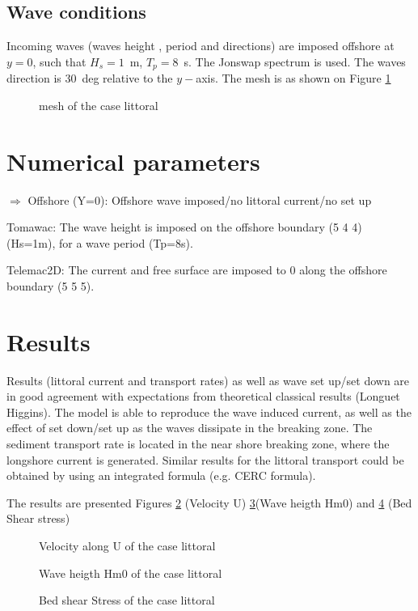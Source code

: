 \subsection{Wave conditions}
Incoming waves (waves height , period and directions) are imposed offshore at $y=0$, such
that $H_s=1$~m, $T_p=8$~s. The Jonswap spectrum is used. The waves direction is $30$~deg
relative to the $y-$axis.
The mesh is as shown on Figure \ref{littoralmesh}
\begin{figure} [!h]
\centering
{}
 \caption{mesh of the case littoral}
\label{littoralmesh}
\end{figure}

\section{Numerical parameters}
%
$\Rightarrow $ Offshore (Y=0): Offshore wave imposed/no littoral current/no set up

Tomawac:
The wave height is imposed on the offshore boundary (5 4 4) (Hs=1m), for a wave period
(Tp=8s).

Telemac2D:
The current and free surface are imposed to 0 along the offshore boundary (5 5 5).

%
%
\section{Results}
%
Results (littoral current and transport rates) as well as wave set up/set down are in good
agreement with expectations from theoretical classical results (Longuet Higgins). The
model is able to reproduce the wave induced current, as well as the effect of set down/set
up as the waves dissipate in the breaking zone.
The sediment transport rate is located in the near shore breaking zone, where the longshore
current is generated.
Similar results for the littoral transport could be obtained by using an integrated formula
(e.g. CERC formula).

The results are presented Figures \ref{resultsT2D} (Velocity U) \ref{resultsTOM}(Wave
heigth Hm0) and  \ref{resultsSIS} (Bed Shear stress)
\begin{figure} [!h]
\centering
{}
 \caption{Velocity along U of the case littoral}
\label{resultsT2D}
\end{figure}
\begin{figure} [!h]
\centering
{}
 \caption{Wave heigth Hm0 of the case littoral}
\label{resultsTOM}
\end{figure}
\begin{figure} [!h]
\centering
{}
 \caption{Bed shear Stress of the case littoral}
\label{resultsSIS}
\end{figure}

